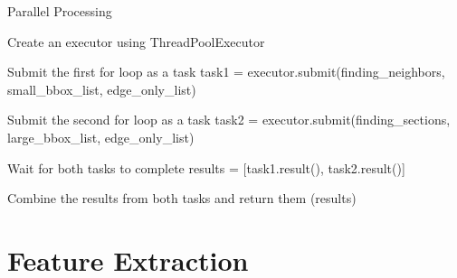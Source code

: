 \documentclass[]{iat}
\begin{document}
\FloatBarrier
\begin{algorithm}[htbp]
    \SetAlgoLined
    \caption{Parallel Processing}
    \label{alg:algo3}


    \BlankLine
    Create an executor using ThreadPoolExecutor\;

    \BlankLine
    Submit the first for loop as a task\;
    task1 = executor.submit(finding\_neighbors, small\_bbox\_list, edge\_only\_list)\;

    \BlankLine
    Submit the second for loop as a task\;
    task2 = executor.submit(finding\_sections, large\_bbox\_list, edge\_only\_list)\;

    \BlankLine
    Wait for both tasks to complete\;
    results = [task1.result(), task2.result()]\;

    \BlankLine
    Combine the results from both tasks and return them\;
    \Return(results)\;
\end{algorithm}

\section{Feature Extraction}
\end{document}
